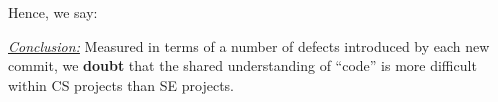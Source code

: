 \documentclass[sigconf,review,anonymous]{acmart}
\newenvironment{RQ}{\vspace{1mm}\begin{tcolorbox}[enhanced,width=3.4in,size=fbox,colback=red!5!white,drop shadow southeast,sharp corners]}{\end{tcolorbox}}
\begin{document}
Hence, we say:

\begin{RQ}
\textit{\underline{Conclusion:}} Measured in terms
of a number of defects introduced by each new commit, we \textbf{doubt} that the shared understanding of ``code'' is more difficult within  CS projects than SE projects.
\end{RQ}




\end{document}

